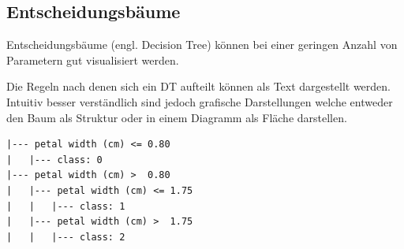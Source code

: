 \documentclass[
  12pt, %
  a4paper, %
  oneside, %
  openany, 
  numbers=noenddot, %
  BCOR=5mm, %
  parskip=half*, %
  thesis, %
]{bfhbook}
\begin{document}
\subsection{Entscheidungsbäume}
Entscheidungsbäume (engl. Decision Tree) können bei einer geringen Anzahl von Parametern gut visualisiert werden.
\begin{center}
\begin{minipage}[t]{0.45\linewidth}
Die Regeln nach denen sich ein \Gls{DT} aufteilt können als Text dargestellt werden. Intuitiv besser verständlich sind jedoch grafische Darstellungen welche entweder den Baum als Struktur oder in einem Diagramm als Fläche darstellen.
\end{minipage}\hfill
\begin{minipage}[t]{0.45\linewidth}
\begin{lstlisting}
|--- petal width (cm) <= 0.80
|   |--- class: 0
|--- petal width (cm) >  0.80
|   |--- petal width (cm) <= 1.75
|   |   |--- class: 1
|   |--- petal width (cm) >  1.75
|   |   |--- class: 2
\end{lstlisting}
\end{minipage}
\end{center}
\end{document}
